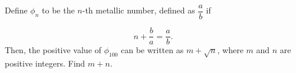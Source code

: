 Define $\phi_n$ to be the $n$-th metallic number, defined as $\dfrac{a}{b}$ if

\[n +\dfrac{b}{a}=\dfrac{a}{b}.\]Then, the positive value of $\phi_{100}$ can be written as $m+\sqrt{n}$, where $m$ and $n$ are positive integers. Find $m + n$.

